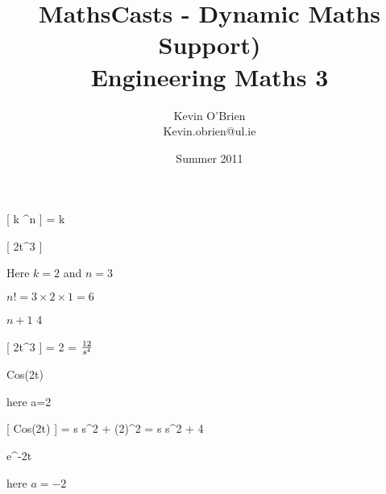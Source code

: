 \documentclass[a4]{beamer}
\title[MathsCast]{MathsCasts - Dynamic Maths Support) \\ {\normalsize Engineering Maths 3}}
\author[Kevin O'Brien]{Kevin O'Brien \\ {\scriptsize Kevin.obrien@ul.ie}}
\date{Summer 2011}
\institute[Maths \& Stats]{Dept. of Mathematics \& Statistics, \\ University \textit{of} Limerick}
\begin{document}


 [ k \; \times \; ^{n} ] = k \; \times \; 

 [ 2t^3 ]

Here $k = 2$ and $n=3$

$n! = 3 \times 2 \times 1 = 6$

$n+1$ 4


 [ 2t^3 ] = 2  = $12 \over s^4$


Cos(2t)

here a=2


 [ Cos(2t) ] = {s \over s^2 + (2)^2 } = {s \over s^2 + 4 }


e^{-2t}

here $a=-2$







\end{document}
